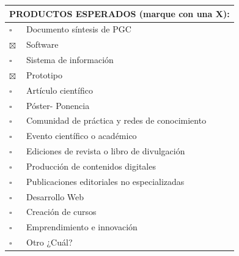 \documentclass[11pt]{article}
\newcommand{\formlabel}[1]{\textbf{\small #1}}
\newcommand{\formcell}[1]{\small #1}
\begin{document}
\vspace{0.10cm}
\noindent
\begin{tabular}{|p{0.72cm}|p{14.50cm}|}
\hline
\multicolumn{2}{|p{15.38cm}|}{\formlabel{PRODUCTOS ESPERADOS (marque con una X):}} \\
\hline
$\square$ & \formcell{Documento síntesis de PGC} \\
\hline
$\boxtimes$ & \formcell{Software} \\
\hline
$\square$ & \formcell{Sistema de información} \\
\hline
$\boxtimes$ & \formcell{Prototipo} \\
\hline
$\square$ & \formcell{Artículo científico} \\
\hline
$\square$ & \formcell{Póster- Ponencia} \\
\hline
$\square$ & \formcell{Comunidad de práctica y redes de conocimiento} \\
\hline
$\square$ & \formcell{Evento científico o académico} \\
\hline
$\square$ & \formcell{Ediciones de revista o libro de divulgación} \\
\hline
$\square$ & \formcell{Producción de contenidos digitales} \\
\hline
$\square$ & \formcell{Publicaciones editoriales no especializadas} \\
\hline
$\square$ & \formcell{Desarrollo Web} \\
\hline
$\square$ & \formcell{Creación de cursos} \\
\hline
$\square$ & \formcell{Emprendimiento e innovación} \\
\hline
$\square$ & \formcell{Otro ¿Cuál?} \\
\hline
\end{tabular}
\end{document}
